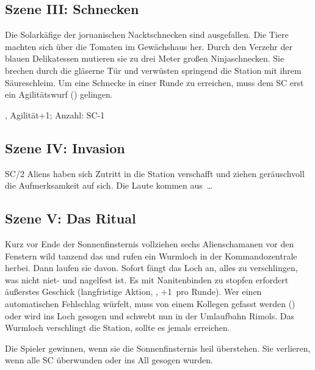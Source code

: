 {		

		\subsection{Szene III: Schnecken}

		\noindent
		Die Solarkäfige der joruanischen Nacktschnecken sind ausgefallen. Die Tiere machten sich über die Tomaten im Gewächshaus her. Durch den Verzehr der blauen Delikatessen mutieren sie zu drei Meter großen Ninjaschnecken. Sie brechen durch die gläserne Tür und verwüsten springend die Station mit ihrem Säureschleim. Um eine Schnecke in einer Runde zu erreichen, muss dem SC erst ein Agilitätswurf () gelingen.

		, Agilität+1; Anzahl: SC-1

		\subsection{Szene IV: Invasion}

		\noindent
		SC/2 Aliens haben sich Zutritt in die Station verschafft und ziehen geräuschvoll die Aufmerksamkeit auf sich. Die Laute kommen aus~\ldots


		\subsection{Szene V: Das Ritual}

		\noindent
		Kurz vor Ende der Sonnenfinsternis vollziehen sechs Alienschamanen vor den Fenstern wild tanzend das  und rufen ein Wurmloch in der Kommandozentrale herbei. Dann laufen sie davon. Sofort fängt das Loch an, alles zu verschlingen, was nicht niet- und nagelfest ist. Es mit Nanitenbinden zu stopfen erfordert äußerstes Geschick (langfristige Aktion, , +1\TN\ pro Runde). Wer einen automatischen Fehlschlag würfelt, muss von einem Kollegen gefasst werden () oder wird ins Loch gesogen und schwebt nun in der Umlaufbahn Rimols. Das Wurmloch verschlingt die Station, sollte es jemals  erreichen.


		\noindent
		Die Spieler gewinnen, wenn sie die Sonnenfinsternis heil überstehen. Sie verlieren, wenn alle SC überwunden oder ins All gesogen wurden.
}
